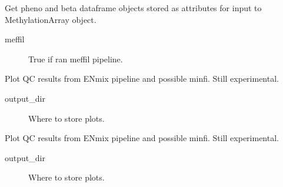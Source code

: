 \documentclass[letterpaper,10pt,english]{sphinxmanual}
\begin{document}
\begin{fulllineitems}
\begin{fulllineitems}
\label{\detokenize{index:pymethylprocess.PreProcessDataTypes.PreProcessIDAT.output_pheno_beta}}
Get pheno and beta dataframe objects stored as attributes for input to MethylationArray object.
\begin{description}
\item[{meffil}] \leavevmode
True if ran meffil pipeline.

\end{description}

\end{fulllineitems}


\begin{fulllineitems}
\label{\detokenize{index:pymethylprocess.PreProcessDataTypes.PreProcessIDAT.plot_original_qc}}
Plot QC results from ENmix pipeline and possible minfi. Still experimental.
\begin{description}
\item[{output\_dir}] \leavevmode
Where to store plots.

\end{description}

\end{fulllineitems}


\begin{fulllineitems}
\label{\detokenize{index:pymethylprocess.PreProcessDataTypes.PreProcessIDAT.plot_qc_metrics}}
Plot QC results from ENmix pipeline and possible minfi. Still experimental.
\begin{description}
\item[{output\_dir}] \leavevmode
Where to store plots.

\end{description}

\end{fulllineitems}


\end{fulllineitems}
\end{document}
